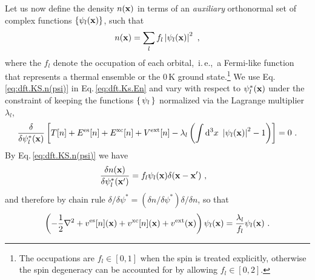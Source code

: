 Let us now define the density $n({\bf x})$ in terms of an \emph{auxiliary} orthonormal set of complex functions $\{ \psi_l ({\bf x}) \}$, such that
\begin{align}
	n({\bf x}) = \sum_l f_l \left\lvert \psi_l ({\bf x}) \right\rvert^2~,
	\label{eq:dft.KS.n(psi)}
\end{align}
where the $f_l$ denote the occupation of each orbital,~i.\,e.,~a Fermi-like function that represents a thermal ensemble or the 0\,K ground state.\footnote{The occupations are $f_l \in [0, 1]$ when the spin is treated explicitly, otherwise the spin degeneracy can be accounted for by allowing $f_l \in [0, 2]$.} We use Eq.\,\eqref{eq:dft.KS.n(psi)} in Eq.\,\eqref{eq:dft.Ks.En} and vary with respect to $\psi^\ast_l ({\bf x})$ under the constraint of keeping the functions $\set{\psi_l}$ normalized via the Lagrange multiplier $\lambda_l$,
\begin{align}
	\frac{\delta}{\delta \psi^\ast_l ({\bf x})}
		\left[
			T[n] +  E^{\rm es}[n] + E^{\rm xc} [n] + V^{\rm ext}[n]
			- \lambda_l \left(
				\int \d^3 x ~ \left\lvert \psi_l ({\bf x}) \right\rvert^2 - 1
			\right)
		\right]
		= 0~.
	\label{eq:dft.Ks.variation.1}
\end{align}
By Eq.\,\eqref{eq:dft.KS.n(psi)} we have
\begin{align}
	\frac{\delta n({\bf x})}{\delta \psi^\ast_l ({\bf x}')}
		&= f_l \psi_l ({\bf x}) \delta ({\bf x} - {\bf x}')~,
	\label{eq:dft.KS.dn}
\end{align}
and therefore by chain rule 
$\delta / \delta \psi^\ast = (\delta n / \delta \psi^\ast) \delta / \delta n$, so that
\begin{align}
	\left(
		-\frac{1}{2} \nabla^2 
		+ v^{\rm es} [n] ({\bf x})
		+ v^{\rm xc} [n] ({\bf x})
		+ v^{\rm ext}  ({\bf x})
	\right) \psi_l ({\bf x})
	= \frac{\lambda_l}{f_l} \psi_l ({\bf x})~.
	\label{eq:dft.KS.1}
\end{align}
